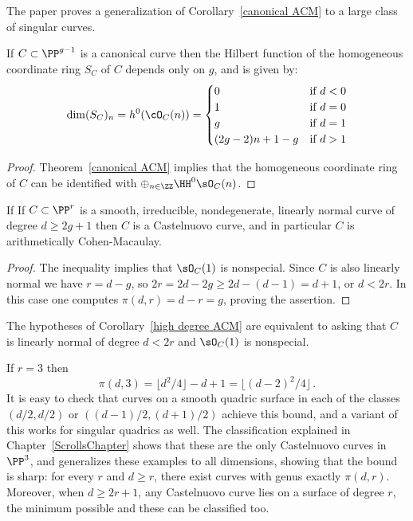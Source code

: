 \begin{fact}
The paper \cite{Schreyer} 
proves a generalization of Corollary~\ref{canonical ACM} to a large class of singular curves.
\end{fact}

 \begin{corollary}\label{canonical hilbert function}
If $C\subset \PP^{g-1}$ is a canonical curve then the Hilbert function of the homogeneous coordinate ring $S_{C}$ of  $C$ depends only on $g$, and is given by:
$$
\dim({S_{C}})_{n} = h^{0}(\cO_{C}(n)) = 
\begin{cases}
 0 &\mbox {if } d<0\\
 1 & \mbox {if }  d=0\\
 g & \mbox {if }  d=1\\
 (2g-2)n + 1 - g & \mbox {if }  d>1\\
\end{cases}
$$
\end{corollary}
\begin{proof}
Theorem~\ref{canonical ACM} implies that the homogeneous coordinate ring of $C$ can be identified with $\oplus_{n\in \ZZ}\HH^0\sO_C(n)$.  
\end{proof}

\begin{corollary}\label{high degree ACM}
If If $C \subset \PP^r$ is a smooth, irreducible, nondegenerate, linearly normal curve of degree $d\geq 2g+1$ then
$C$ is a Castelnuovo curve, and in particular $C$ is arithmetically Cohen-Macaulay.
 \end{corollary}

\begin{proof}
The inequality implies that $\sO_C(1)$ is nonspecial. Since $C$ is also linearly normal we have
 $r = d-g$, so $2r = 2d-2g \geq 2d - (d-1) = d+1$, or $d<2r$. In this case one computes $\pi(d,r) = d-r = g$,
 proving the assertion.
\end{proof}

\begin{remark}
 The hypotheses of Corollary~\ref{high degree ACM} are equivalent to asking that $C$ is linearly
 normal of degree $d<2r$ and $\sO_C(1)$ is nonspecial.
\end{remark}

\begin{example}If $r=3$ then
$$
\pi(d,3) = \lfloor d^2/4 \rfloor-d+1 = \lfloor (d-2)^2/4\rfloor\, .
$$
It is easy to check that curves on a smooth quadric surface in each of the classes
$(d/2, d/2)$ or $((d-1)/2, (d+1)/2)$
achieve this bound, and a variant of this works for singular quadrics as well. The classification  explained in Chapter~\ref{ScrollsChapter}
shows that these are the only Castelnuovo curves in $\PP^3$, and generalizes these examples to all dimensions, showing
that the bound is sharp: for every $r$ and $d \geq r$, there exist curves with genus exactly $\pi(d,r)$. Moreover, when
$d\geq 2r+1$, any Castelnuovo curve lies on a surface of  degree $r$, the minimum possible and these can be classified too.
\end{example}

